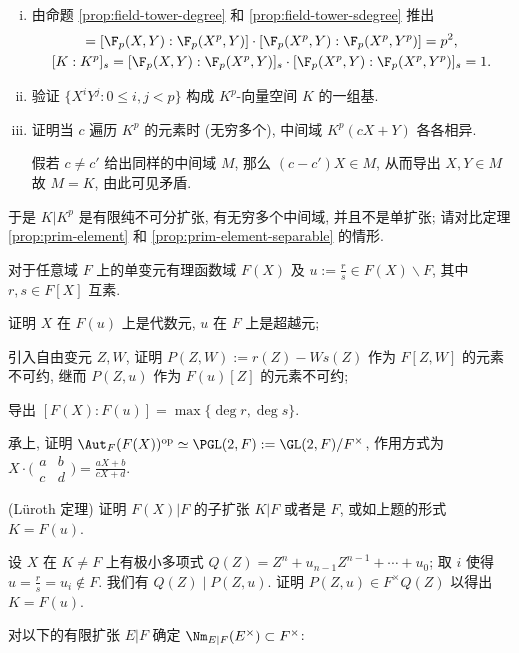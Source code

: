 \begin{Exercises}
\begin{enumerate}[(i)]
			\item 由命题 \ref{prop:field-tower-degree} 和 \ref{prop:field-tower-sdegree} 推出
				\begin{gather*}
					[K:K^p] = [\F_p(X,Y):\F_p(X^p,Y)] \cdot [\F_p(X^p,Y):\F_p(X^p,Y^p)] = p^2, \\
					[K:K^p]_s = [\F_p(X,Y):\F_p(X^p,Y)]_s \cdot [\F_p(X^p,Y):\F_p(X^p,Y^p)]_s = 1.
				\end{gather*}
			\item 验证 $\{ X^i Y^j: 0 \leq i,j < p \}$ 构成 $K^p$-向量空间 $K$ 的一组基.
			\item 证明当 $c$ 遍历 $K^p$ 的元素时 (无穷多个), 中间域 $K^p(cX + Y)$ 各各相异.
			\begin{hint} 假若 $c \neq c'$ 给出同样的中间域 $M$, 那么 $(c-c')X \in M$, 从而导出 $X,Y \in M$ 故 $M = K$, 由此可见矛盾. \end{hint}
		\end{enumerate}
		于是 $K|K^p$ 是有限纯不可分扩张, 有无穷多个中间域, 并且不是单扩张; 请对比定理 \ref{prop:prim-element} 和 \ref{prop:prim-element-separable} 的情形.
	\item 对于任意域 $F$ 上的单变元有理函数域 $F(X)$ 及 $u := \frac{r}{s} \in F(X) \smallsetminus F$, 其中 $r,s \in F[X]$ 互素.
		\begin{compactenum}[(i)]
			\item 证明 $X$ 在 $F(u)$ 上是代数元, $u$ 在 $F$ 上是超越元;
			\item 引入自由变元 $Z, W$, 证明 $P(Z,W) := r(Z) - Ws(Z)$ 作为 $F[Z,W]$ 的元素不可约, 继而 $P(Z,u)$ 作为 $F(u)[Z]$ 的元素不可约;
			\item 导出 $[F(X):F(u)] = \max\{\deg r, \deg s\}$.
		\end{compactenum}
	\item 承上, 证明 $\Aut_F(F(X))^{\mathrm{op}} \simeq \PGL(2,F) := \GL(2,F)/F^\times$, 作用方式为 $X \cdot \bigl( \begin{smallmatrix} a & b \\ c & d \end{smallmatrix} \bigr) = \frac{aX+b}{cX+d}$.
	\item (Lüroth 定理) 证明 $F(X)|F$ 的子扩张 $K|F$ 或者是 $F$, 或如上题的形式 $K=F(u)$. 
	\begin{hint}
		设 $X$ 在 $K \neq F$ 上有极小多项式 $Q(Z) = Z^n + u_{n-1} Z^{n-1} + \cdots + u_0$; 取 $i$ 使得 $u = \frac{r}{s} = u_i \notin F$. 我们有 $Q(Z) \mid P(Z,u)$. 证明 $P(Z,u) \in F^\times Q(Z)$ 以得出 $K=F(u)$.
	\end{hint}
	\item 对以下的有限扩张 $E|F$ 确定 $\Nm_{E|F}(E^\times) \subset F^\times$:

\end{Exercises}
